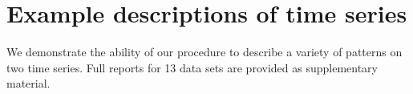 \documentclass[letterpaper]{article}
\begin{document}






\section{Example descriptions of time series}
\label{sec:examples}
We demonstrate the ability of our procedure to describe a variety of patterns on two time series.
Full reports for 13 data sets are provided as supplementary material.
\end{document}
